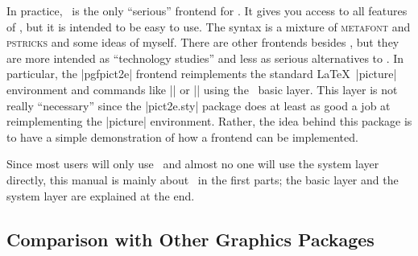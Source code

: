 In practice, \tikzname\ is the only ``serious'' frontend for \pgfname. It
gives you access to all features of \pgfname, but it is intended to be
easy to use. The syntax is a mixture of \textsc{metafont} and
\textsc{pstricks} and some ideas of myself. There are other frontends
besides \tikzname, but they are more intended as ``technology
studies'' and less as serious alternatives to \tikzname. In
particular, the |pgfpict2e| frontend   reimplements the standard
\LaTeX\ |{picture}|  environment and 
commands like |\line| or |\vector| 
using the \pgfname\ basic layer. This layer is not really ``necessary''
since the |pict2e.sty| package does at least as good a job at
reimplementing the |{picture}| environment. Rather, the idea
behind this package is to have a simple demonstration of how a
frontend can be implemented. 

Since most users will only use \tikzname\ and almost no one will use
the system layer directly, this manual is mainly about \tikzname\ in
the first parts; the basic layer and the system layer are explained at
the end.


\subsection{Comparison with Other Graphics Packages}

